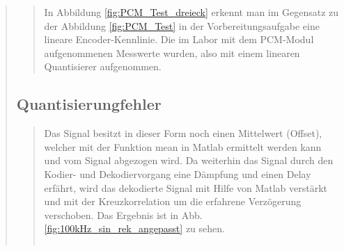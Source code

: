 \begin{quote}
\begin{quote}
    In Abbildung \ref{fig:PCM_Test_dreieck} erkennt man im Gegensatz zu der Abbildung \ref{fig:PCM_Test} in der
    Vorbereitungsaufgabe eine lineare Encoder-Kennlinie. Die im Labor mit dem PCM-Modul aufgenommenen Messwerte wurden,
    also mit einem linearen Quantisierer aufgenommen.
    
    \end{quote}
    
    
    \subsection{Quantisierungfehler}
    
    \begin{quote}
        Das Signal besitzt in dieser Form noch einen Mittelwert (Offset), welcher mit der Funktion mean in Matlab ermittelt
        werden kann und vom Signal abgezogen wird. Da weiterhin das Signal durch den Kodier- und Dekodiervorgang eine
        Dämpfung und einen Delay erfährt, wird das dekodierte Signal mit Hilfe von Matlab verstärkt und mit der Kreuzkorrelation
        um die erfahrene Verzögerung verschoben. Das Ergebnis ist in Abb. \ref{fig:100kHz_sin_rek_angepasst} zu sehen. \\
        
        \begin{center}
            \begin{tabular}{ll}
            

\end{tabular}
\end{center}
\end{quote}
\end{quote}

